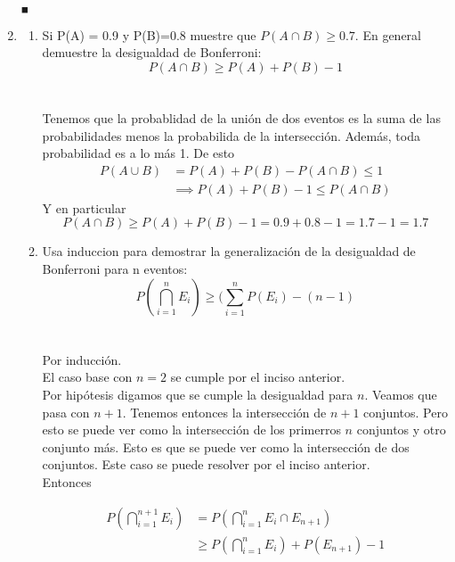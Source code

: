 \documentclass[12pt,a4paper]{report}
\begin{document}
\begin{enumerate}
{\begin{enumerate}[label=\Roman*.]
{		\begin{flushright}
			$_{\blacksquare}$
		\end{flushright}
	}
	\end{enumerate}


	}

   \item {
  	\begin{enumerate}[label=\alph*) ]
   \item {
	Si P(A) = 0.9 y P(B)=0.8 muestre que $P(A \cap B) \geq 0.7$. En general demuestre la desigualdad de Bonferroni:\\
	$$P(A \cap B) \geq P(A)+P(B) -1$$\\\\

	Tenemos que la probablidad de la unión de dos eventos es la suma de las
	probabilidades menos la probabilida de la intersección. Además, toda probabilidad
	es a lo más 1. De esto
	\begin{align*}
		P(A \cup B) &= P(A) + P(B) - P(A \cap B) \leq 1\\
								&\implies P(A) + P(B) - 1 \leq P(A \cap B)
	\end{align*}
	Y en particular
	\begin{equation*}
		P(A \cap B) \geq P(A) + P(B) - 1 = 0.9 + 0.8 - 1 = 1.7 - 1 = 1.7
	\end{equation*}

   }

   \item {
 	Usa induccion para demostrar la generalización de la desigualdad de Bonferroni para n eventos:\\
 	$$P(\bigcap\limits_{i=1}^{n} E_{i}) \geq (\sum_{i=1}^{n} P(E_{i})-(n-1)$$\\\\

 	Por inducción.	\\
	El caso base con $n = 2$ se cumple por el inciso anterior.\\
 	Por hipótesis digamos que se cumple la desigualdad para $n$.
	Veamos que pasa con $n+1$.
	Tenemos entonces la intersección de $n+1$ conjuntos. Pero esto se puede ver
	como la intersección de los primerros $n$ conjuntos y otro conjunto más.
	Esto es que se puede ver como la intersección de dos conjuntos. Este caso se
	puede resolver por el inciso anterior.\\
	Entonces

	\begin{align*}
		P(\bigcap\limits_{i=1}^{n+1} E_{i}) &= P(\bigcap\limits_{i=1}^{n} E_{i} \cap E_{n+1})\\
																				&\geq P(\bigcap\limits_{i=1}^{n} E_{i}) + P(E_{n+1}) - 1
	\end{align*}



}
\end{enumerate}}
\end{enumerate}
\end{document}
